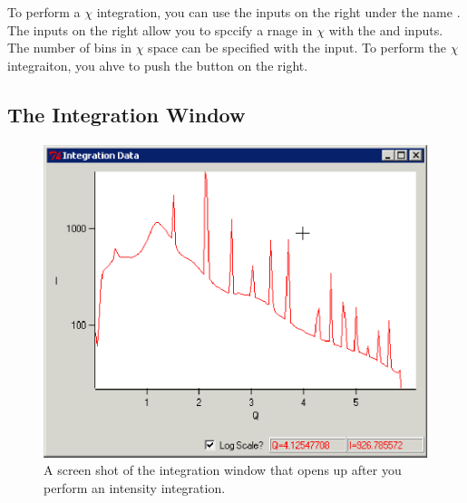 To perform a $\chi$ integration, you can use the inputs
on the right under the name .
The inputs on the right allow you to spccify
a rnage in $\chi$ with the  and
 inputs. The number of bins in
$\chi$ space can be specified with the
 input. To perform the
$\chi$ integraiton, you ahve to push the
 button on the right.

\subsection{The Integration Window}

\begin{figure}
\centering
\includegraphics[scale=.75]{figures/integration_window_q.eps}
\caption{A screen shot of the integration window that
    opens up after you perform an intensity integration.} 
\label{integration_window_q}
\end{figure}

